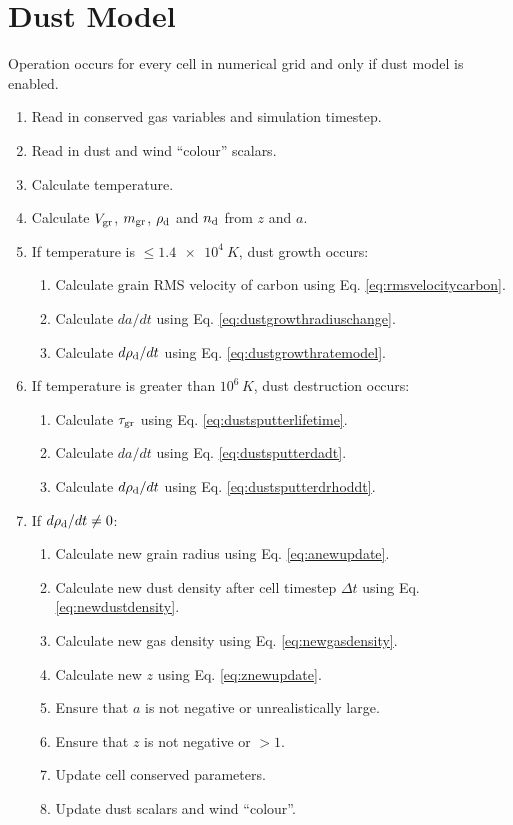 \section{Dust Model}

Operation occurs for every cell in numerical grid and only if dust model is enabled.

\begin{enumerate}
  \item Read in conserved gas variables and simulation timestep.
  \item Read in dust and wind ``colour'' scalars.
  \item Calculate temperature.
  \item Calculate $V_\text{gr}$, $m_\text{gr}$, $\rho_\text{d}$ and $n_\text{d}$ from $z$ and $a$.
  \item If temperature is $\leq \SI{1.4e4}{K}$, dust growth occurs:
  \begin{enumerate}
    \item Calculate grain RMS velocity of carbon using Eq. \ref{eq:rmsvelocitycarbon}.
    \item Calculate $da/dt$ using Eq. \ref{eq:dustgrowthradiuschange}.
    \item Calculate $d\rho_\text{d}/dt$ using Eq. \ref{eq:dustgrowthratemodel}.
  \end{enumerate}
  \item If temperature is greater than $10^6\,\si{K}$, dust destruction occurs:
  \begin{enumerate}
    \item Calculate $\tau_\text{gr}$ using Eq. \ref{eq:dustsputterlifetime}.
    \item Calculate $da/dt$ using Eq. \ref{eq:dustsputterdadt}.
    \item Calculate $d\rho_\text{d}/dt$ using Eq. \ref{eq:dustsputterdrhoddt}.
  \end{enumerate}
  \item If $d\rho_\text{d}/dt \neq 0$:
  \begin{enumerate}
    \item Calculate new grain radius using Eq. \ref{eq:anewupdate}.
    \item Calculate new dust density after cell timestep $\Delta t$ using Eq. \ref{eq:newdustdensity}.
    \item Calculate new gas density using Eq. \ref{eq:newgasdensity}.
    \item Calculate new $z$ using Eq. \ref{eq:znewupdate}.
    \item Ensure that $a$ is not negative or unrealistically large.
    \item Ensure that $z$ is not negative or $>1$.
    \item Update cell conserved parameters.
    \item Update dust scalars and wind ``colour''.
  \end{enumerate}
\end{enumerate}

